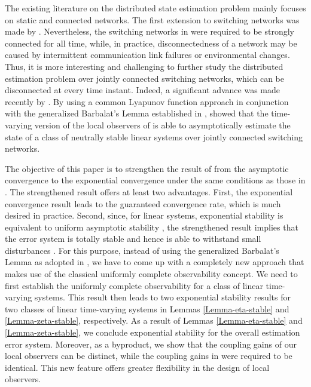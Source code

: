 \documentclass[twocolumn]{autart}
\begin{document}
The existing literature on the distributed state estimation problem mainly focuses on static and connected networks.
The first extension to switching networks was made by \cite{WangLiu20}.
Nevertheless, the switching networks in \cite{WangLiu20} were required to be strongly connected for all time,
while, in practice, disconnectedness of a network may be caused by intermittent communication link failures or environmental changes.
Thus, it is more interesting and challenging to further study the distributed estimation problem over jointly connected switching networks,
which can be disconnected at every time instant. Indeed, a significant advance was made recently by \cite{ZhangLu21ACC}.
By using a common Lyapunov function approach in conjunction with the generalized Barbalat's Lemma established in \cite{SuHuang12Full},
\cite{ZhangLu21ACC} showed that the time-varying version of the local observers of \cite{KimShim20} is able to
asymptotically estimate the state of a class of neutrally stable linear systems over jointly connected switching networks.



The objective of this paper is to strengthen the result of \cite{ZhangLu21ACC}
from the asymptotic convergence to the exponential convergence under the same conditions as those in \cite{ZhangLu21ACC}.
The strengthened result offers at least two advantages.
First, the exponential convergence result leads to the guaranteed convergence rate,
which is much desired in practice.
Second, since, for linear systems, exponential stability is equivalent to uniform asymptotic stability \citep{Rugh96},
the strengthened result implies that the error system is totally stable and hence is able to withstand small disturbances \citep{Slotine91}.
For this purpose, instead of using the generalized Barbalat's Lemma as adopted in \cite{ZhangLu21ACC},
we have to come up with a completely new approach that makes use of the classical uniformly complete observability concept.
We need to first establish the uniformly complete observability for a class of linear time-varying systems.
This result then leads to two exponential stability results for two classes of linear time-varying systems
in Lemmas \ref{Lemma-eta-stable} and \ref{Lemma-zeta-stable}, respectively.
As a result of Lemmas \ref{Lemma-eta-stable} and \ref{Lemma-zeta-stable},
we conclude exponential stability for the overall estimation error system.
Moreover, as a byproduct, we show that the coupling gains of our local observers can be distinct,
while the coupling gains in \cite{ZhangLu21ACC} were required to be identical.
This new feature offers greater flexibility in the design of local observers.
\end{document}

